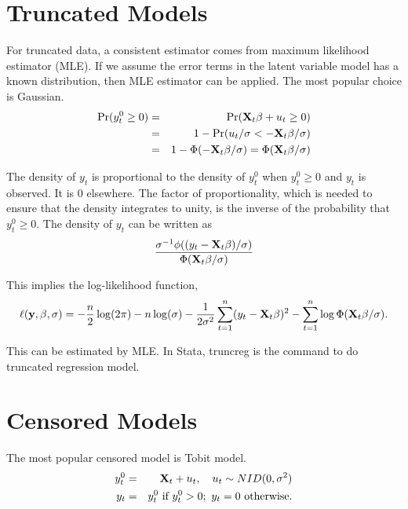 
\section{Truncated Models} 

For truncated data, a consistent estimator comes from maximum
likelihood estimator (MLE).  If we assume the error terms in the
latent variable model has a known distribution, then MLE estimator can
be applied.  The most popular choice is Gaussian.
\begin{eqnarray}
\mbox{Pr}(y_t^0 \geq 0) & = & \mbox{Pr} ({\bf X}_t \beta +u_t \geq
0) \nonumber \\
& = & 1- \mbox{Pr} (u_t/\sigma < - {{\bf X}_t \beta} / \sigma)
\nonumber \\
 & = & 1- \Phi (-{{\bf X}_t \beta} / \sigma)=\Phi ({{\bf X}_t \beta} / \sigma)
\end{eqnarray}

The density of $y_t$ is proportional to the density of $y_t^0$
when $y_t^0 \geq 0$ and $y_t$ is observed.  It is 0 elsewhere. The
factor of proportionality, which is needed to ensure that the
density integrates to unity, is the inverse of the probability
that $y_t^0 \geq 0$.  The density of $y_t$ can be written as
\begin{equation}
\frac{\sigma^{-1} \phi ((y_t - {\bf X}_t \beta)/\sigma)}{\Phi
({\bf X}_t \beta / \sigma)}
\end{equation}

This implies the log-likelihood function,
\begin{equation}
\ell ({\bf y, \beta}, \sigma)=- \frac{n}{2} \log(2 \pi) -n
\log(\sigma) - \frac{1}{2 \sigma^2} \sum_{t=1}^n(y_t-{\bf X}_t
\beta)^2 - \sum_{t=1}^n \log \Phi ({\bf X}_t \beta / \sigma).
\end{equation}

This can be estimated by MLE.  In Stata, truncreg is the command to do
truncated regression model.

\section{Censored Models}

The most popular censored model is Tobit model.
\begin{eqnarray}
y_t^0 & = & {\bf X}_t +u_t, \quad u_t \sim NID(0, \sigma^2) \nonumber \\
y_t & = & y_t^0 \ \mbox{if} \ y_t^0 > 0; \ y_t=0 \
\mbox{otherwise}.
\end{eqnarray}

